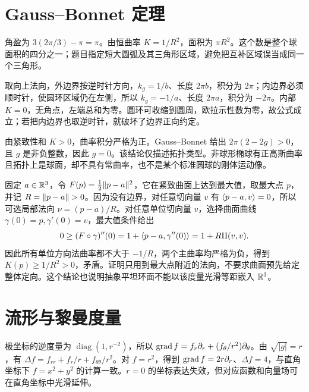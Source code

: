 \section{Gauss--Bonnet 定理}
\begin{solve}
角盈为 $3(2\pi/3)-\pi=\pi$。由恒曲率 $K=1/R^2$，面积为 $\pi R^2$。这个数是整个球面积的四分之一；题目指定短大圆弧及其三角形区域，避免把互补区域误当成同一个三角形。
\end{solve}

\begin{solve}
取向上法向，外边界按逆时针方向，$k_g=1/b$、长度 $2\pi b$，积分为 $2\pi$；内边界必须顺时针，使圆环区域仍在左侧，所以 $k_g=-1/a$、长度 $2\pi a$，积分为 $-2\pi$。内部 $K=0$，无角点，左端总和为零。圆环可收缩到圆周，欧拉示性数为零，故公式成立；若把内边界也取逆时针，就破坏了边界正向约定。
\end{solve}

\begin{solve}
由紧致性和 $K>0$，曲率积分严格为正。Gauss--Bonnet 给出 $2\pi(2-2g)>0$，且 $g$ 是非负整数，因此 $g=0$。该结论仅描述拓扑类型。非球形椭球有正高斯曲率且拓扑上是球面，却不具有常曲率，也不是某个标准圆球的刚体运动像。
\end{solve}

\begin{solve}
固定 $a\in\mathbb R^3$，令 $F(p)=\tfrac12\lVert p-a\rVert^2$，它在紧致曲面上达到最大值，取最大点 $p$，并记 $R=\lVert p-a\rVert>0$。因为没有边界，对任意切向量 $v$ 有 $\langle p-a,v\rangle=0$，所以可选局部法向 $\nu=(p-a)/R$。对任意单位切向量 $v$，选择曲面曲线 $\gamma(0)=p,\gamma'(0)=v$，最大值条件给出
\[
 0\ge(F\circ\gamma)''(0)=1+\langle p-a,\gamma''(0)\rangle
 =1+R\mathrm{II}(v,v).
\]
因此所有单位方向法曲率都不大于 $-1/R$，两个主曲率均严格为负，得到 $K(p)\ge1/R^2>0$，矛盾。证明只用到最大点附近的法向，不要求曲面预先给定整体定向。这个结论也说明抽象平坦环面不能以该度量光滑等距嵌入 $\mathbb R^3$。
\end{solve}

\section{流形与黎曼度量}
\begin{solve}
极坐标的逆度量为 $\operatorname{diag}(1,r^{-2})$，所以 $\operatorname{grad} f=f_r\partial_r+(f_\theta/r^2)\partial_\theta$。由 $\sqrt{|g|}=r$，有 $\Delta f=f_{rr}+f_r/r+f_{\theta\theta}/r^2$。对 $f=r^2$，得到 $\operatorname{grad} f=2r\partial_r$、$\Delta f=4$，与直角坐标下 $f=x^2+y^2$ 的计算一致。$r=0$ 的坐标表达失效，但对应函数和向量场可在直角坐标中光滑延伸。
\end{solve}

